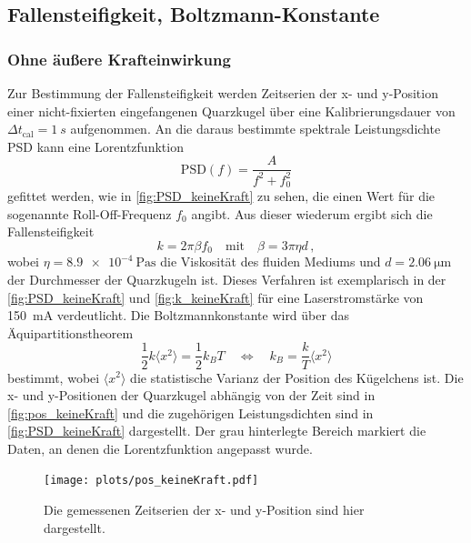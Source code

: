 \subsection{Fallensteifigkeit, Boltzmann-Konstante}
\subsubsection*{Ohne äußere Krafteinwirkung}
    Zur Bestimmung der Fallensteifigkeit werden Zeitserien der x- und y-Position einer nicht-fixierten eingefangenen Quarzkugel über eine Kalibrierungsdauer von $\Delta t_{\mathrm{cal}} = \qty{1}{s}$ aufgenommen.
    An die daraus bestimmte spektrale Leistungsdichte PSD kann eine Lorentzfunktion
    \begin{equation*}
        \mathrm{PSD}(f) = \frac{A}{f^2 + f_0^2}
    \end{equation*}
    gefittet werden, wie in \autoref{fig:PSD_keineKraft} zu sehen, die einen Wert für die sogenannte Roll-Off-Frequenz $f_0$ angibt.
    Aus dieser wiederum ergibt sich die Fallensteifigkeit
    \begin{equation*}
        k = 2 \pi \beta f_0 \quad \mathrm{mit} \quad \beta = 3 \pi \eta d \,,
    \end{equation*}
    wobei $\eta = \qty{8,9e-4}{\pascal \second}$ die Viskosität des fluiden Mediums und $d=\qty{2,06}{\um}$ der Durchmesser der Quarzkugeln ist.
    Dieses Verfahren ist exemplarisch in der \autoref{fig:PSD_keineKraft} und \ref{fig:k_keineKraft} für eine Laserstromstärke von \qty{150}{mA} verdeutlicht.
    Die Boltzmannkonstante wird über das Äquipartitionstheorem
    \begin{equation*}
        \frac{1}{2} k \langle x^2 \rangle = \frac{1}{2} k_B T \quad \Leftrightarrow \quad k_B = \frac{k}{T} \langle x^2 \rangle
    \end{equation*}
    bestimmt, wobei $\langle x^2 \rangle$ die statistische Varianz der Position des Kügelchens ist.
    Die x- und y-Positionen der Quarzkugel abhängig von der Zeit sind in \autoref{fig:pos_keineKraft} und die zugehörigen Leistungsdichten sind in \autoref{fig:PSD_keineKraft} dargestellt.
    Der grau hinterlegte Bereich markiert die Daten, an denen die Lorentzfunktion angepasst wurde.
    \begin{figure}[ht]
        \centering\captionsetup{format=plain}
        \texttt{[image: plots/pos\_keineKraft.pdf]} \vspace*{-0.5cm}
        \caption{Die gemessenen Zeitserien der x- und y-Position sind hier dargestellt.}
        \label{fig:pos_keineKraft}
    \end{figure}
